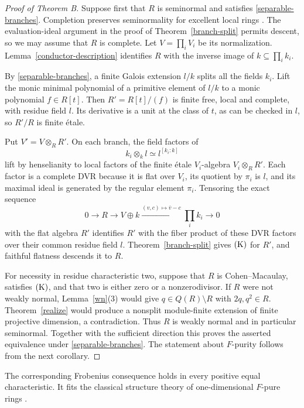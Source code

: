 \begin{proof}[Proof of Theorem B]
Suppose first that $R$ is seminormal and satisfies
\eqref{separable-branches}.  Completion preserves seminormality for
excellent local rings \cite[Cor.~5.3]{GT}.  The evaluation-ideal
argument in the proof of Theorem~\ref{branch-split} permits descent, so we may assume
that $R$ is complete.  Let $V=\prod_iV_i$ be its normalization.
Lemma~\ref{conductor-description} identifies $R$ with the inverse image
of $k\subseteq\prod_i k_i$.

By \eqref{separable-branches}, a finite Galois extension $l/k$ splits
all the fields $k_i$.  Lift the monic minimal polynomial of a primitive
element of $l/k$ to a monic polynomial $f\in R[t]$.  Then
$R'=R[t]/(f)$ is finite free, local and complete, with residue field
$l$.  Its derivative is a unit at the class of $t$, as can be checked
in $l$, so $R'/R$ is finite \'etale.

Put $V'=V\otimes_RR'$.  On each branch, the field factors of
\[
 k_i\otimes_k l\simeq l^{[k_i:k]}
\]
lift by henselianity to local factors of the finite \'etale
$V_i$-algebra $V_i\otimes_RR'$.  Each factor is a complete DVR because it is
flat over $V_i$, its quotient by $\pi_i$ is $l$, and its maximal ideal
is generated by the regular element $\pi_i$.  Tensoring the exact
sequence
\[
 0\longrightarrow R\longrightarrow V\oplus k
 \xrightarrow{(v,c)\mapsto\overline v-c}\prod_i k_i
 \longrightarrow0
\]
with the flat algebra $R'$ identifies $R'$ with the fiber product of
these DVR factors over their common residue field $l$.  Theorem~\ref{branch-split}
gives $\mathrm{(K)}$ for $R'$, and faithful flatness descends it to $R$.

For necessity in residue characteristic two, suppose that $R$ is
Cohen--Macaulay, satisfies $\mathrm{(K)}$, and that two is either zero or a
nonzerodivisor.  If $R$ were not weakly normal, Lemma~\ref{wn}(3) would
give $q\in Q(R)\setminus R$ with $2q,q^2\in R$.  Theorem~\ref{realize} would
produce a nonsplit module-finite extension of finite projective dimension,
a contradiction.  Thus $R$ is weakly normal and in particular
seminormal.  Together with the sufficient direction this proves the
asserted equivalence under \eqref{separable-branches}.  The statement
about $F$-purity follows from the next corollary.
\end{proof}

The corresponding Frobenius consequence holds in every positive equal
characteristic.  It fits the classical structure theory of
one-dimensional $F$-pure rings \cite{GW,Gib}.

